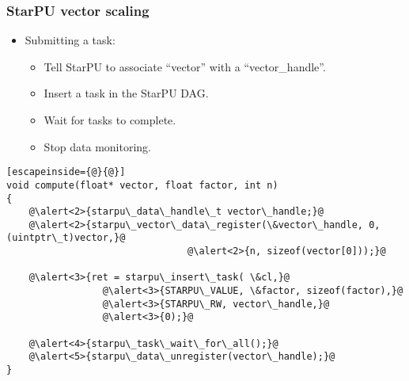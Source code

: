 \begin{frame}[fragile]
  \frametitle{StarPU vector scaling}
  \begin{itemize}
  \item Submitting a task:
    \begin{itemize}
    \item<2-> Tell StarPU to associate ``vector'' with a ``vector\_handle''.
    \item<3-> Insert a task in the StarPU DAG.
    \item<4-> Wait for tasks to complete.
    \item<5-> Stop data monitoring.
    \end{itemize}
  \end{itemize}
  \begin{block}{}
\begin{lstlisting}[escapeinside={@}{@}]
void compute(float* vector, float factor, int n)
{
    @\alert<2>{starpu\_data\_handle\_t vector\_handle;}@
    @\alert<2>{starpu\_vector\_data\_register(\&vector\_handle, 0, (uintptr\_t)vector,}@
                                @\alert<2>{n, sizeof(vector[0]));}@

    @\alert<3>{ret = starpu\_insert\_task( \&cl,}@
                 @\alert<3>{STARPU\_VALUE, \&factor, sizeof(factor),}@
                 @\alert<3>{STARPU\_RW, vector\_handle,}@
                 @\alert<3>{0);}@

    @\alert<4>{starpu\_task\_wait\_for\_all();}@
    @\alert<5>{starpu\_data\_unregister(vector\_handle);}@
}
\end{lstlisting}
  \end{block}
\end{frame}
